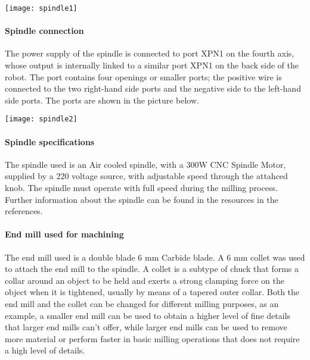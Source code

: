  \begin{center}
 	\texttt{[image: spindle1]}
 \end{center}

\paragraph{Spindle connection}
The power supply of the spindle is connected to port XPN1 on the fourth axis, whose output is internally linked to a similar port XPN1 on the back side of the robot. The port contains four openings or smaller ports; the positive wire is connected to the two right-hand side ports and the negative side to the left-hand side ports. The ports are shown in the picture below.

  \begin{center}
 	\texttt{[image: spindle2]}
 \end{center}

\paragraph{Spindle specifications }

The spindle used is an Air cooled spindle, with a 300W CNC Spindle Motor, supplied by a 220 voltage source, with adjustable speed through the attahced knob. The spindle must operate with full speed during the milling process. Further information about the spindle can be found in the resources in the references. 

\paragraph{End mill used for machining}

The end mill used is a double blade 6 mm Carbide blade. A 6 mm collet was used to attach the end mill to the spindle. A collet is a subtype of chuck that forms a collar around an object to be held and exerts a strong clamping force on the object when it is tightened, usually by means of a tapered outer collar. Both the end mill and the collet can be changed for different milling purposes, as an example, a smaller end mill can be used to obtain a higher level of fine details that larger end mills can’t offer, while larger end mills can be used to remove more material or perform faster in basic milling operations that does not require a high level of details.